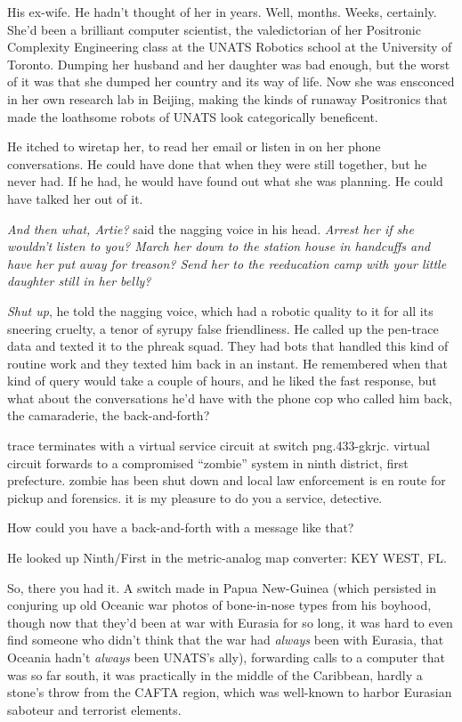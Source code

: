 His ex-wife. He hadn’t thought of her in years. Well, months.
Weeks, certainly. She’d been a brilliant computer scientist, the
valedictorian of her Positronic Complexity Engineering class at the
UNATS Robotics school at the University of Toronto. Dumping her
husband and her daughter was bad enough, but the worst of it was
that she dumped her country and its way of life. Now she was
ensconced in her own research lab in Beijing, making the kinds of
runaway Positronics that made the loathsome robots of UNATS look
categorically beneficent.

He itched to wiretap her, to read her email or listen in on her
phone conversations. He could have done that when they were still
together, but he never had. If he had, he would have found out what
she was planning. He could have talked her out of it.

\emph{And then what, Artie?} said the nagging voice in his head.
\emph{Arrest her if she wouldn’t listen to you? March her down to the station house in handcuffs and have her put away for treason? Send her to the reeducation camp with your little daughter still in her belly?}

\emph{Shut up}, he told the nagging voice, which had a robotic
quality to it for all its sneering cruelty, a tenor of syrupy false
friendliness. He called up the pen-trace data and texted it to the
phreak squad. They had bots that handled this kind of routine work
and they texted him back in an instant. He remembered when that
kind of query would take a couple of hours, and he liked the fast
response, but what about the conversations he’d have with the phone
cop who called him back, the camaraderie, the back-and-forth?

\begin{robot}
trace terminates with a virtual service circuit at switch
png.433-gkrjc. virtual circuit forwards to a compromised “zombie”
system in ninth district, first prefecture. zombie has been shut
down and local law enforcement is en route for pickup and
forensics. it is my pleasure to do you a service, detective.
\end{robot}

How could you have a back-and-forth with a message like that?

He looked up Ninth/First in the metric-analog map converter: KEY
WEST, FL.

So, there you had it. A switch made in Papua New-Guinea (which
persisted in conjuring up old Oceanic war photos of bone-in-nose
types from his boyhood, though now that they’d been at war with
Eurasia for so long, it was hard to even find someone who didn’t
think that the war had \emph{always} been with Eurasia, that
Oceania hadn’t \emph{always} been UNATS’s ally), forwarding calls
to a computer that was so far south, it was practically in the
middle of the Caribbean, hardly a stone’s throw from the CAFTA
region, which was well-known to harbor Eurasian saboteur and
terrorist elements.

